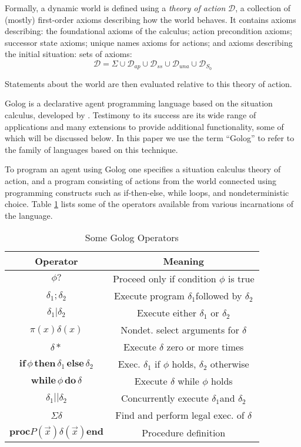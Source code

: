 \documentclass[letterpaper]{article}
\begin{document}
Formally, a dynamic world is defined using a \emph{theory of action}
$\mathcal{D}$, a collection of (mostly) first-order axioms describing
how the world behaves. It contains axioms describing: the foundational
axioms of the calculus; action precondition axioms; successor state
axioms; unique names axioms for actions; and axioms describing the
initial situation:
sets of axioms:
\begin{equation}
\label{eqn:sc_action_theory}
\mathcal{D}=\Sigma\cup\mathcal{D}_{ap}\cup\mathcal{D}_{ss}\cup\mathcal{D}_{una}\cup\mathcal{D}_{S_{0}}
\end{equation}

Statements about the world are then evaluated relative to this theory
of action.

Golog is a declarative agent programming language based on the situation
calculus, developed by \cite{levesque97golog}. Testimony
to its success are its wide range of applications and many extensions
to provide additional functionality, some of which will be discussed below.
In this paper we use the term ``Golog'' to refer to the family
of languages based on this technique.

To program an agent using Golog one specifies a situation calculus
theory of action, and a program consisting of actions from the world
connected using programming constructs such as if-then-else, while
loops, and nondeterministic choice. Table \ref{tbl:Golog-Operators}
lists some of the operators available from various incarnations of
the language.

\begin{table}[t]
\begin{center}\begin{tabular}{|c|c|}
\hline 
Operator&
Meaning\tabularnewline
\hline
\hline 
$\phi?$&
Proceed only if condition $\phi$ is true\tabularnewline
\hline 
$\delta_{1};\delta_{2}$&
Execute program $\delta_{1}$followed by $\delta_{2}$\tabularnewline
\hline 
$\delta_{1}|\delta_{2}$&
Execute either $\delta_{1}$ or $\delta_{2}$\tabularnewline
\hline 
$\pi(x)\delta(x)$&
Nondet. select arguments for $\delta$\tabularnewline
\hline 
$\delta*$&
Execute $\delta$ zero or more times\tabularnewline
\hline 
$\mathbf{if}\,\phi\,\mathbf{then}\,\delta_{1}\,\mathbf{else}\,\delta_{2}$&
Exec. $\delta_{1}$ if $\phi$ holds, $\delta_{2}$ otherwise\tabularnewline
\hline 
$\mathbf{while\,}\phi\mathbf{\, do}\,\delta$&
Execute $\delta$ while $\phi$ holds\tabularnewline
\hline 
$\delta_{1}||\delta_{2}$&
Concurrently execute $\delta_{1}$and $\delta_{2}$\tabularnewline
\hline 
$\Sigma\delta$&
Find and perform legal exec. of $\delta$\tabularnewline
\hline 
$\mathbf{proc}P(\overrightarrow{x})\delta(\overrightarrow{x})\mathbf{end}$&
Procedure definition\tabularnewline
\hline
\end{tabular}\end{center}


\caption{Some Golog Operators\label{tbl:Golog-Operators}}
\end{table}
\end{document}
